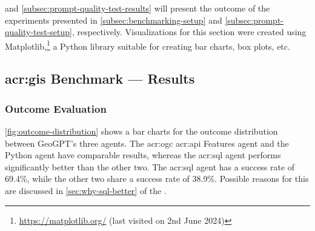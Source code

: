 \begin{comment}
Results should be clearly displayed and should provide a suitable representation of your results for the points you wish to make.
Graphs should be labelled in a legible font. If more than one result is displayed in the same graph, then these should be clearly marked.
Please choose carefully rather than presenting every result. Too much information is hard to read and often hides the key information you wish to present. Make use of statistical methods when presenting results, where possible to strengthen the results.
Further, the format of the presentation of results should be chosen based on what issues in the results you wish to highlight.
You may wish to present a subset in the experimental section and provide additional results in an appendix.
Point out specifics here but save the overall/general discussion to the Discussion chapter.
\end{comment}

 and \autoref{subsec:prompt-quality-test-results} will present the outcome of the experiments presented in \autoref{subsec:benchmarking-setup} and \autoref{subsec:prompt-quality-test-setup}, respectively. Visualizations for this section were created using Matplotlib,\footnote{\url{https://matplotlib.org/} (last visited on 2nd June 2024)} a Python library suitable for creating bar charts, box plots, etc.


\subsection[GIS Benchmark Experiment --- Results]{\acrshort{acr:gis} Benchmark --- Results}
\label{subsec:quantitative-results}

\subsubsection{Outcome Evaluation}

\autoref{fig:outcome-distribution} shows a bar charts for the outcome distribution between GeoGPT's three agents. The \acrshort{acr:ogc} \acrshort{acr:api} Features agent and the Python agent have comparable results, whereas the \acrshort{acr:sql} agent performs significantly better than the other two. The \acrshort{acr:sql} agent has a success rate of 69.4\%, while the other two share a success rate of 38.9\%. Possible reasons for this are discussed in \autoref{sec:why-sql-better} of the .

